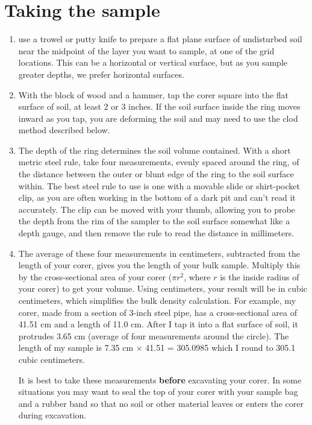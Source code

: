 \documentclass[11pt,letterpaper,twoside,onecolumn]{memoir}
\begin{document}
\section*{Taking the sample}
\begin{enumerate}
\item  use a trowel or putty knife to prepare a flat plane surface of undisturbed soil near the midpoint of the layer you want to sample, at one of the grid locations. This can be a horizontal or vertical surface, but as you sample greater depths, we prefer horizontal surfaces. 

\item With the block of wood and a hammer, tap the corer square into the flat surface of soil, at least 2 or 3 inches. If the soil surface inside the ring moves inward as you tap, you are deforming the soil and may need to use the clod method described below.

\item The depth of the ring determines the soil volume contained. With a short metric steel rule, take four measurements, evenly spaced around the ring, of the distance between the outer or blunt edge of the ring to the soil surface within. The best steel rule to use is one with a movable slide or shirt-pocket clip, as you are often working in the bottom of a dark pit and can't read it accurately. The clip can be moved with your thumb, allowing you to probe the depth from the rim of the sampler to the soil surface somewhat like a depth gauge, and then remove the rule to read the distance in millimeters.

\item {The average of these four measurements in centimeters, subtracted from the length of your corer, gives you the length of your bulk sample. Multiply this by the cross-sectional area of your corer ($\pi r^{2}$, where $r$ is the inside radius of your corer) to get your volume. Using centimeters, your result will be in cubic centimeters, which simplifies the bulk density calculation. For example, my corer, made from a section of 3-inch steel pipe, has a cross-sectional area of 41.51 cm and a length of 11.0 cm. After I tap it into a flat surface of soil, it protrudes 3.65 cm (average of four measurements around the circle). The length of my sample is 7.35 cm $\times$ 41.51 = 305.0985 which I round to 305.1 cubic centimeters.

It is best to take these measurements \textbf{before} excavating your corer. In some situations you may want to seal the top of your corer with your sample bag and a rubber band so that no soil or other material leaves or enters the corer during excavation.}


\end{enumerate}
\end{document}
